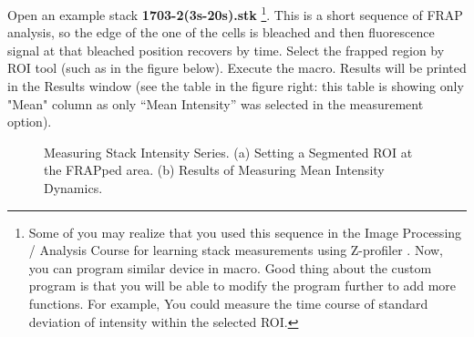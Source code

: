 Open an example stack \textbf{1703-2(3s-20s).stk}
\footnote{Some of you may realize that you used this sequence 
in the Image Processing / Analysis Course for learning 
stack measurements using Z-profiler . Now, you can program similar 
device in macro. 
Good thing about the custom program
is that you will be able to modify the program further to add more functions.
For example, You could measure the time course of standard deviation of
intensity within the selected ROI.}. This is a short sequence of FRAP analysis,
so the edge of the one of the cells is bleached and then fluorescence signal at that bleached position recovers by time. 
Select the frapped region by ROI tool (such as in the figure below). 
Execute the macro. Results will be printed in the Results window (see the table in the figure right: this table is showing only "Mean" column as only ``Mean Intensity'' was selected in the measurement option). 

\begin{figure}[htbp]
 \centering
 \quad
 \caption{Measuring Stack Intensity Series. (a) Setting a Segmented ROI at the FRAPped area. (b) Results of Measuring Mean Intensity Dynamics.}
 \label{fig:frapresults}
\end{figure}


